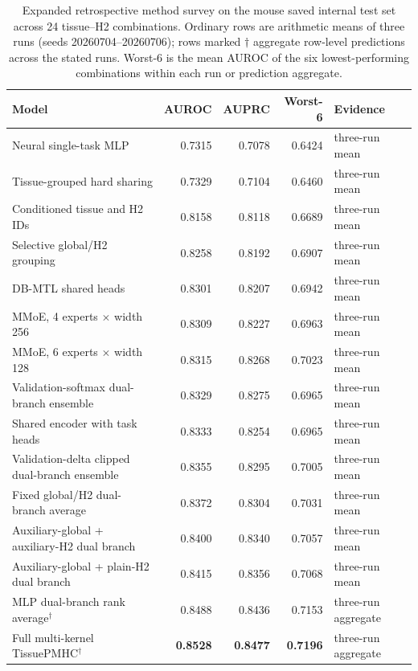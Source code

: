 \begin{table}[t]
\centering
\caption{Expanded retrospective method survey on the mouse saved internal test set across 24 tissue--H2 combinations. Ordinary rows are arithmetic means of three runs (seeds 20260704--20260706); rows marked $\dagger$ aggregate row-level predictions across the stated runs. Worst-6 is the mean AUROC of the six lowest-performing combinations within each run or prediction aggregate.}
\label{tab:mouse-baselines}
\footnotesize
\renewcommand{\arraystretch}{1.06}
\setlength{\tabcolsep}{2.5pt}
\begin{tabularx}{\textwidth}{>{\raggedright\arraybackslash}Xrrr
                            >{\raggedright\arraybackslash}p{2.5cm}}
\toprule
Model & AUROC & AUPRC & Worst-6 & Evidence \\ 
\midrule
Neural single-task MLP & 0.7315 & 0.7078 & 0.6424 & three-run mean \\
Tissue-grouped hard sharing & 0.7329 & 0.7104 & 0.6460 & three-run mean \\
Conditioned tissue and H2 IDs & 0.8158 & 0.8118 & 0.6689 & three-run mean \\
Selective global/H2 grouping & 0.8258 & 0.8192 & 0.6907 & three-run mean \\
DB-MTL shared heads & 0.8301 & 0.8207 & 0.6942 & three-run mean \\
MMoE, 4 experts $\times$ width 256 & 0.8309 & 0.8227 & 0.6963 & three-run mean \\
MMoE, 6 experts $\times$ width 128 & 0.8315 & 0.8268 & 0.7023 & three-run mean \\
Validation-softmax dual-branch ensemble & 0.8329 & 0.8275 & 0.6965 & three-run mean \\
Shared encoder with task heads & 0.8333 & 0.8254 & 0.6965 & three-run mean \\
Validation-delta clipped dual-branch ensemble & 0.8355 & 0.8295 & 0.7005 & three-run mean \\
Fixed global/H2 dual-branch average & 0.8372 & 0.8304 & 0.7031 & three-run mean \\
Auxiliary-global + auxiliary-H2 dual branch & 0.8400 & 0.8340 & 0.7057 & three-run mean \\
Auxiliary-global + plain-H2 dual branch & 0.8415 & 0.8356 & 0.7068 & three-run mean \\
MLP dual-branch rank average$^\dagger$ & 0.8488 & 0.8436 & 0.7153 & three-run aggregate \\
Full multi-kernel TissuePMHC$^\dagger$ & \textbf{0.8528} & \textbf{0.8477} & \textbf{0.7196} & three-run aggregate \\
\bottomrule
\end{tabularx}
\end{table}

